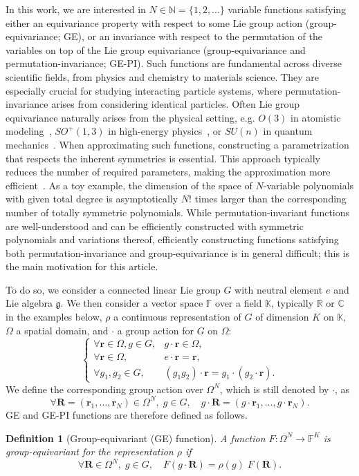 \documentclass{article}
\newtheorem{definition}[theorem]{Definition}
\numberwithin{equation}{section}
\def\N{\mathbb{N}}
\def\K{\mathbb{K}}
\def\R{\mathbb{R}}
\def\C{\mathbb{C}}
\def\F{\mathbb{F}}
\def\br{{\bm r}}
\def\bR{{\bm R}}
\def\Nat{{N}}
\begin{document}
In this work, we are interested in $\Nat \in \N = \{1,2,\ldots\}$ variable functions satisfying either an equivariance property with respect to some Lie group action (group-equivariance; GE), or an invariance with respect to the permutation of the variables on top of the Lie group equivariance (group-equivariance and permutation-invariance; GE-PI). 
Such functions are fundamental across diverse scientific fields, from physics and chemistry to materials science. They are especially crucial for studying interacting particle systems, where permutation-invariance arises from considering identical particles.
Often Lie group equivariance naturally arises from the physical setting, e.g. $O(3)$ in atomistic modeling~\cite{Batatia2022-zi}, $SO^+(1,3)$ in high-energy physics~\cite{Munoz2022-ur}, or $SU(n)$ in quantum mechanics~\cite{Lagrave2021-cw,Favoni2022-zb}.
When approximating such functions, constructing a parametrization that respects the inherent symmetries is essential. 
This approach typically reduces the number of required parameters, making the approximation more efficient~\cite{Bachmayr2024-pv}.
As a toy example, the dimension of the space of $N$-variable polynomials with 
given total degree is asymptotically $\Nat!$ times larger than the corresponding number of totally symmetric polynomials.
While permutation-invariant functions are well-understood and can be efficiently constructed with symmetric polynomials and variations thereof, 
efficiently constructing functions satisfying both permutation-invariance and group-equivariance is in general difficult; this is the main motivation for this article.


To do so, we consider a  connected linear
Lie group $G$ with neutral element $e$ and Lie algebra $\mathfrak g$.
We then consider  a vector space
$\F$
over a field $\K$, typically $\R$ or $\C$ in the examples below, $\rho$ a continuous representation of $G$ of dimension $K$ on $\K$, $\Omega$ a spatial domain, and $\cdot$ a group action for $G$ on $\Omega$:
\[
    \left\{ 
    \begin{array}{lc}
        \forall \br\in \Omega, g\in G,  &  g\cdot \br \in \Omega, \\
       \forall \br\in \Omega,  & e \cdot \br = \br, \\
       \forall g_1,g_2\in G, & 
       (g_1 g_2) \cdot \br = g_1 \cdot (g_2 \cdot \br).
    \end{array}
    \right.
\]
We define the corresponding group action over $\Omega^\Nat$, which is still denoted by $\cdot$, 
as 
\[
    \forall \bR = (\br_1,\ldots,\br_\Nat) \in \Omega^\Nat, \; 
     g \in G, \quad 
    g \cdot \bR = 
    (g \cdot \br_1, 
    \ldots, 
    g \cdot \br_\Nat).
\]
GE  and GE-PI functions are therefore defined as follows.
\begin{definition}[Group-equivariant (GE) function]
    A function $F: \Omega^\Nat \rightarrow \F^K$ is group-equivariant for the representation $\rho$ if 
\begin{equation}\label{eq:GE}
  \forall \bR \in \Omega^\Nat, \;  g \in G,  \quad   F(g \cdot \bR) = \rho(g) \; F(\bR).
\end{equation}
\end{definition}
\end{document}
